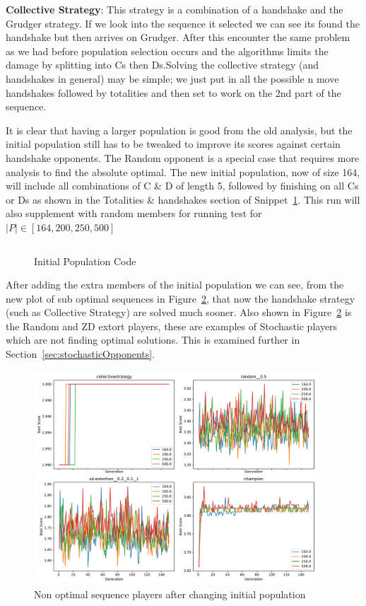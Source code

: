 \textbf{Collective Strategy}: This strategy is a combination of a handshake and the Grudger strategy.
If we look into the sequence it selected we can see its found the handshake but then arrives on Grudger.
After this encounter the same problem as we had before population selection occurs and the algorithms limits the damage by splitting into Cs then Ds.Solving the collective strategy (and handshakes in general) may be simple;
we just put in all the possible n move handshakes followed by totalities and then set to work on the 2nd part of the sequence.

It is clear that having a larger population is good from the old analysis, but the initial population still has to be tweaked to improve its scores against certain handshake opponents.
The Random opponent is a special case that requires more analysis to find the absolute optimal.
The new initial population, now of size 164, will include all combinations of C \& D of length 5, followed by finishing on all Cs or Ds as shown in the Totalities \& handshakes section of Snippet~\ref{code:initialPopulationCode}.
This run will also supplement with random members for running test for \(|P| \in [164,200,250,500]\)

\begin{figure}
    \inputminted{python}{code_snippets/initialPopulationCode.py}
    \caption{Initial Population Code}\label{code:initialPopulationCode}
\end{figure}

After adding the extra members of the initial population we can see, from the new plot of sub optimal sequences in Figure~\ref{fig:NEW-INIT-POP-bs-v-gen-non-performers}, that now the handshake strategy (such as Collective Strategy) are solved much sooner.
Also shown in Figure~\ref{fig:NEW-INIT-POP-bs-v-gen-non-performers} is the Random and ZD extort players, these are examples of Stochastic players which are not finding optimal solutions.
This is examined further in Section~\ref{sec:stochasticOpponents}.

\begin{figure}[ht]
    \includegraphics[width=0.95\textwidth, keepaspectratio, center]{./img/plots/NEW_INIT_POP_bs_v_gen_non_performers.pdf}
    \caption{Non optimal sequence players after changing initial population}\label{fig:NEW-INIT-POP-bs-v-gen-non-performers}
\end{figure}

